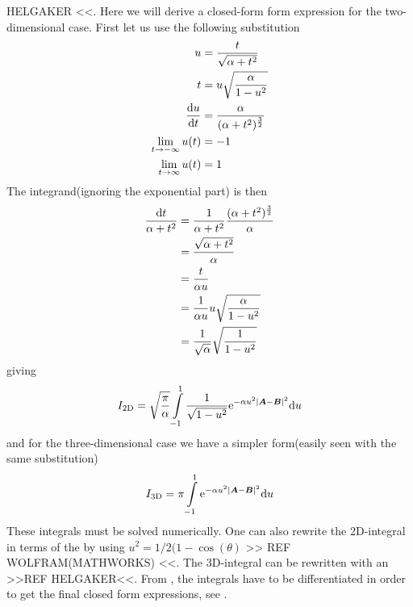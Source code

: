    HELGAKER <<. Here we will derive a closed-form form expression for the
    two-dimensional case. First let us use the following substitution
        \begin{equation}
            \begin{aligned}
                u &= \frac{t}{\sqrt{\alpha+t^2}} \\
                t &= u\sqrt{\frac{\alpha}{1-u^2}} \\
                \frac{\mathrm{d} u}{\mathrm{d} t} &= \frac{\alpha}{(\alpha + t^2)^{\frac{3}{2}}} \\
                \lim\limits_{t\rightarrow -\infty} u(t) &= -1 \\
                \lim\limits_{t\rightarrow \infty} u(t) &= 1 \\
            \end{aligned}
            \label{eq:uSubs1}
        \end{equation}
    The integrand(ignoring the exponential part) is then
        \begin{align}
            \frac{\mathrm{d} t}{\alpha + t^2} &= \frac{1}{\alpha + t^2} \frac{(\alpha +
            t^2)^{\frac{3}{2}}}{\alpha} \nonumber \\
            &= \frac{\sqrt{\alpha + t^2}}{\alpha} \nonumber \\
            &= \frac{t}{\alpha u} \nonumber \\
            &= \frac{1}{\alpha u} u\sqrt{\frac{\alpha}{1-u^2}} \nonumber \\
            &= \frac{1}{\sqrt{\alpha}}\sqrt{\frac{1}{1-u^2}}
        \end{align}
    giving
        \begin{align}
            I_{\text{2D}} = \sqrt{\frac{\pi}{\alpha}}\int\limits^1_{-1}
            \frac{1}{\sqrt{1-u^2}} \mathrm{e}^{-\alpha u^2\abs{\boldsymbol{{A}} - \boldsymbol{{B}}}^2}
            \mathrm{d} u
            \label{eq:oneElectron2D}
        \end{align}
    and for the three-dimensional case we have a simpler form(easily seen with
    the same substitution)
        \begin{align}
            I_{\text{3D}} = \pi\int\limits^1_{-1} \mathrm{e}^{-\alpha u^2\abs{\boldsymbol{{A}}
            - \boldsymbol{{B}}}^2} \mathrm{d} u
            \label{eq:oneElectron3D}
        \end{align}
    These integrals must be solved numerically. One can also rewrite the
    2D-integral in terms of the 
    by using $u^2=1/2(1 - \cos(\theta)$ >> REF WOLFRAM(MATHWORKS) <<. The
    3D-integral can be rewritten with an 
    >>REF HELGAKER<<. From , the integrals have to be
    differentiated in order to get the final closed form expressions, see
    .

